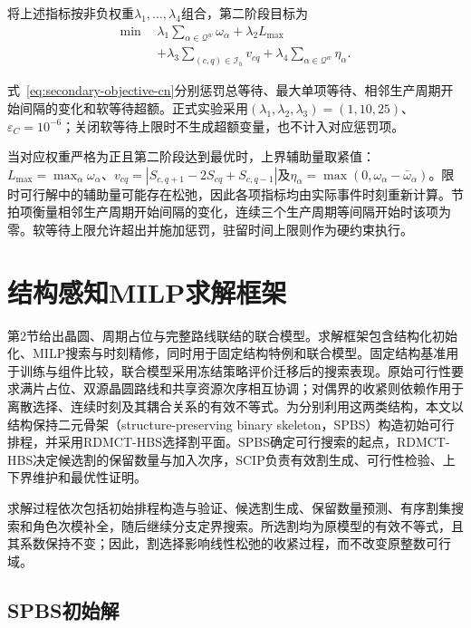 \documentclass[final,5p,times,twocolumn]{elsarticle}
\newcommand{\method}{RDMCT-HBS}
\begin{document}
将上述指标按非负权重$\lambda_1,\ldots,\lambda_4$组合，第二阶段目标为
\begin{equation}
\begin{aligned}
\min\ \ &\lambda_1\sum_{\alpha\in\mathcal Q^w}\omega_\alpha+\lambda_2L_{\max}\\
&+\lambda_3\sum_{(c,q)\in\mathcal I_h}v_{cq}
+\lambda_4\sum_{\alpha\in\mathcal Q^w}\eta_\alpha.
\end{aligned}
\label{eq:secondary-objective-cn}
\end{equation}

式~\eqref{eq:secondary-objective-cn}分别惩罚总等待、最大单项等待、相邻生产周期开始间隔的变化和软等待超额。正式实验采用$(\lambda_1,\lambda_2,\lambda_3)=(1,10,25)$、$\varepsilon_C=10^{-6}$；关闭软等待上限时不生成超额变量，也不计入对应惩罚项。

当对应权重严格为正且第二阶段达到最优时，上界辅助量取紧值：$L_{\max}=\max_\alpha\omega_\alpha$、$v_{cq}=|S_{c,q+1}-2S_{cq}+S_{c,q-1}|$及$\eta_\alpha=\max(0,\omega_\alpha-\bar\omega_\alpha)$。限时可行解中的辅助量可能存在松弛，因此各项指标均由实际事件时刻重新计算。节拍项衡量相邻生产周期开始间隔的变化，连续三个生产周期等间隔开始时该项为零。软等待上限允许超出并施加惩罚，驻留时间上限则作为硬约束执行。

\section{结构感知MILP求解框架}

第2节给出晶圆、周期占位与完整路线联结的联合模型。求解框架包含结构化初始化、MILP搜索与时刻精修，同时用于固定结构特例和联合模型。固定结构基准用于训练与组件比较，联合模型采用冻结策略评价迁移后的搜索表现。原始可行性要求满片占位、双源晶圆路线和共享资源次序相互协调；对偶界的收紧则依赖作用于离散选择、连续时刻及其耦合关系的有效不等式。为分别利用这两类结构，本文以结构保持二元骨架（structure-preserving binary skeleton，SPBS）构造初始可行排程，并采用\method{}选择割平面。SPBS确定可行搜索的起点，\method{}决定候选割的保留数量与加入次序，SCIP负责有效割生成、可行性检验、上下界维护和最优性证明\citep{achterberg2009scip,bestuzheva2023scip}。

求解过程依次包括初始排程构造与验证、候选割生成、保留数量预测、有序割集搜索和角色次模补全，随后继续分支定界搜索。所选割均为原模型的有效不等式，且其系数保持不变；因此，割选择影响线性松弛的收紧过程，而不改变原整数可行域。

\subsection{SPBS初始解}
\end{document}
